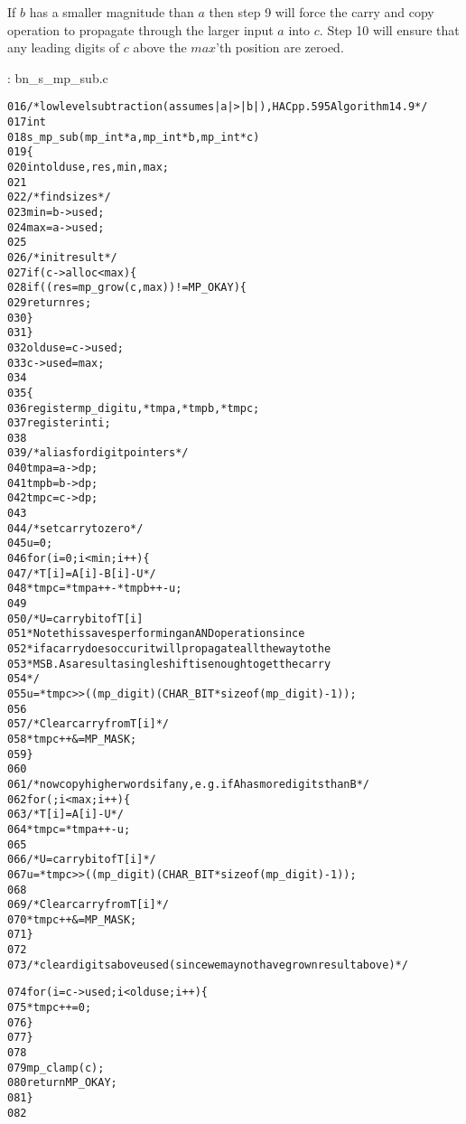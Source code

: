 \documentclass[b5paper]{book}
\begin{document}
If $b$ has a smaller magnitude than $a$ then step 9 will force the carry and copy operation to propagate through the larger input $a$ into $c$.  Step
10 will ensure that any leading digits of $c$ above the $max$'th position are zeroed.

\vspace{+3mm}\begin{small}
\hspace{-5.1mm}{\bf File}: bn\_s\_mp\_sub.c
\vspace{-3mm}
\begin{alltt}
016   /* low level subtraction (assumes |a| > |b|), HAC pp.595 Algorithm 14.9 */
017   int
018   s_mp_sub (mp_int * a, mp_int * b, mp_int * c)
019   \{
020     int     olduse, res, min, max;
021   
022     /* find sizes */
023     min = b->used;
024     max = a->used;
025   
026     /* init result */
027     if (c->alloc < max) \{
028       if ((res = mp_grow (c, max)) != MP_OKAY) \{
029         return res;
030       \}
031     \}
032     olduse = c->used;
033     c->used = max;
034   
035     \{
036       register mp_digit u, *tmpa, *tmpb, *tmpc;
037       register int i;
038   
039       /* alias for digit pointers */
040       tmpa = a->dp;
041       tmpb = b->dp;
042       tmpc = c->dp;
043   
044       /* set carry to zero */
045       u = 0;
046       for (i = 0; i < min; i++) \{
047         /* T[i] = A[i] - B[i] - U */
048         *tmpc = *tmpa++ - *tmpb++ - u;
049   
050         /* U = carry bit of T[i]
051          * Note this saves performing an AND operation since
052          * if a carry does occur it will propagate all the way to the
053          * MSB.  As a result a single shift is enough to get the carry
054          */
055         u = *tmpc >> ((mp_digit)(CHAR_BIT * sizeof (mp_digit) - 1));
056   
057         /* Clear carry from T[i] */
058         *tmpc++ &= MP_MASK;
059       \}
060   
061       /* now copy higher words if any, e.g. if A has more digits than B  */
062       for (; i < max; i++) \{
063         /* T[i] = A[i] - U */
064         *tmpc = *tmpa++ - u;
065   
066         /* U = carry bit of T[i] */
067         u = *tmpc >> ((mp_digit)(CHAR_BIT * sizeof (mp_digit) - 1));
068   
069         /* Clear carry from T[i] */
070         *tmpc++ &= MP_MASK;
071       \}
072   
073       /* clear digits above used (since we may not have grown result above) */
      
074       for (i = c->used; i < olduse; i++) \{
075         *tmpc++ = 0;
076       \}
077     \}
078   
079     mp_clamp (c);
080     return MP_OKAY;
081   \}
082   
\end{alltt}
\end{small}
\end{document}
